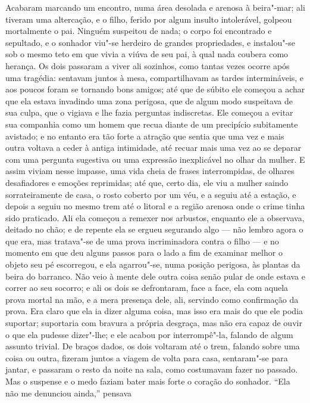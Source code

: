 Acabaram marcando um encontro, numa área desolada e arenosa à beira"-mar;
ali tiveram uma altercação, e o filho, ferido por algum insulto
intolerável, golpeou mortalmente o pai.  Ninguém suspeitou de nada; o
corpo foi encontrado e sepultado, e o sonhador viu"-se herdeiro de
grandes propriedades, e instalou"-se sob o mesmo teto em que vivia a
viúva de seu pai, à qual nada coubera como herança.  Os dois passaram a
viver ali sozinhos, como tantas vezes ocorre após uma tragédia:
sentavam juntos à mesa, compartilhavam as tardes intermináveis, e aos
poucos foram se tornando bons amigos; até que de súbito ele começou a
achar que ela estava invadindo uma zona perigosa, que de algum modo
suspeitava de sua culpa, que o vigiava e lhe fazia perguntas
indiscretas.  Ele começou a evitar sua companhia como um homem que
recua diante de um precipício subitamente avistado; e no entanto era
tão forte a atração que sentia que uma vez e mais outra voltava a ceder
à antiga intimidade, até recuar mais uma vez ao se deparar com uma
pergunta sugestiva ou uma expressão inexplicável no olhar da mulher.  E
assim viviam nesse impasse, uma vida cheia de frases interrompidas, de
olhares desafiadores e emoções reprimidas; até que, certo dia, ele viu
a mulher saindo sorrateiramente de casa, o rosto coberto por um véu, e
a seguiu até a estação, e depois a seguiu no mesmo trem até o litoral e
a região arenosa onde o crime tinha sido praticado.  Ali ela começou a
remexer nos arbustos, enquanto ele a observava, deitado no chão; e de
repente ela se ergueu segurando algo --- não lembro agora o que era, mas
tratava"-se de uma prova incriminadora contra o filho --- e no momento em
que deu alguns passos para o lado a fim de examinar melhor o objeto seu
pé escorregou, e ela agarrou"-se, numa posição perigosa, às plantas da
beira do barranco.  Não veio à mente dele outra coisa senão pular de
onde estava e correr ao seu socorro; e ali os dois se defrontaram, face
a face, ela com aquela prova mortal na mão, e a mera presença dele,
ali, servindo como confirmação da prova.  Era claro que ela ia dizer
alguma coisa, mas isso era mais do que ele podia suportar; suportaria
com bravura a própria desgraça, mas não era capaz de ouvir o que ela
pudesse dizer"-lhe; e ele acabou por interrompê"-la, falando de algum
assunto trivial.  De braços dados, os dois voltaram até o trem, falando
sobre uma coisa ou outra, fizeram juntos a viagem de volta para casa,
sentaram"-se para jantar, e passaram o resto da noite na sala, como
costumavam fazer no passado.  Mas o suspense e o medo faziam bater mais
forte o coração do sonhador.  “Ela não me denunciou ainda,” pensava
